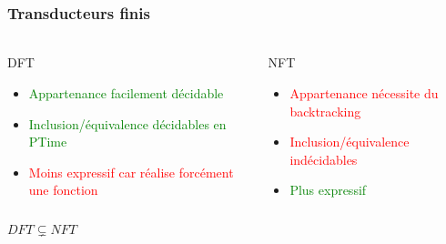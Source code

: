 \frametitle{Transducteurs finis}
\framesubtitle{}

\begin{columns}[t]
	\begin{column}{0.5\linewidth}
		\Large{DFT}
		\begin{itemize}
			\item \textcolor{green}{Appartenance facilement décidable}
			\item \textcolor{green}{Inclusion/équivalence décidables en PTime}
			\item \textcolor{red}{Moins expressif car réalise forcément une fonction}
		\end{itemize}
	\end{column}
	\begin{column}{0.5\linewidth}
		\Large{NFT}
		\begin{itemize}
			\item \textcolor{red}{Appartenance nécessite du backtracking}
			\item \textcolor{red}{Inclusion/équivalence indécidables}
			\item \textcolor{green}{Plus expressif}
		\end{itemize}
	\end{column}
\end{columns}

\center
\LARGE{$DFT \subsetneq NFT$}